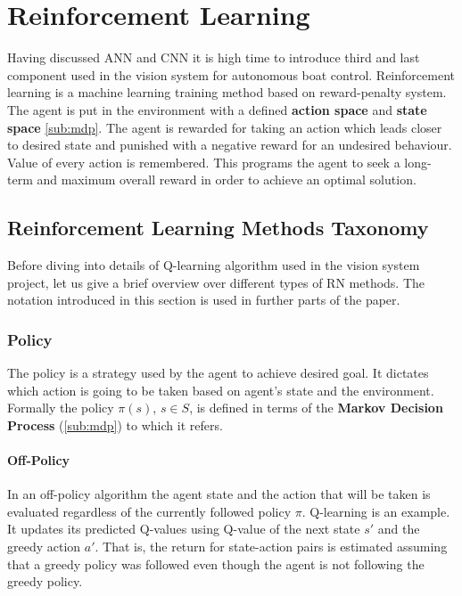 \chapter{Reinforcement Learning}
\label{cha:reinforcement-learning}

Having discussed ANN and CNN it is high time to introduce third and last component used in the vision system for autonomous boat control. Reinforcement learning is a machine learning training method based on reward-penalty system. The agent is put in the environment with a defined \textbf{action space} and \textbf{state space} \ref{sub:mdp}. The agent is rewarded for taking an action which leads closer to desired state and punished with a negative reward for an undesired behaviour. Value of every action is remembered. This programs the agent to seek a long-term and maximum overall reward in order to achieve an optimal solution.

\section{Reinforcement Learning Methods Taxonomy}
\label{sec:classification-of-reinforcement-learning-methods}

Before diving into details of Q-learning algorithm used in the vision system project, let us give a brief overview over different types of RN methods. The notation introduced in this section is used in further parts of the paper.

\subsection{Policy}
\label{sub:policy}

The policy is a strategy used by the agent to achieve desired goal. It dictates which action is going to be taken based on agent's state and the environment. Formally the policy $\pi(s)$, $s\in{S}$, is defined in terms of the \textbf{Markov Decision Process} (\ref{sub:mdp}) to which it refers. 

\subsubsection*{Off-Policy}
\label{sub2:off-poicy}

In an off-policy algorithm the agent state and the action that will be taken is evaluated regardless of the currently followed policy $\pi$. Q-learning is an example. It updates its predicted Q-values using Q-value of the next state $s'$ and the greedy action $a'$. That is, the return for state-action pairs is estimated assuming that a greedy policy was followed even though the agent is not following the greedy policy.

